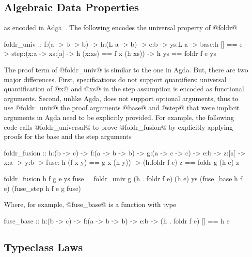 \subsection{Algebraic Data Properties}
\label{subsec:fold}


as encoded in Adga~\citep{agdaequational}.
%
The following encodes the universal property of @foldr@
%
\begin{code}
  foldr_univ :: f:(a -> b -> b)
             -> h:(L a -> b)
             -> e:b
             -> ys:L a
             -> base:{h [] == e }
             -> step:(x:a -> xs:[a] -> {h (x:xs) == f x (h xs)})
             -> {h ys == foldr f e ys}
\end{code}
%
The \toolname proof term of @foldr_univ@
is similar to the one in Agda.
But, there are two major differences.
%
First, specifications do not support
quantifiers: universal quantification
of @x@ and @xs@ in the step assumption
is encoded as functional arguments.
%
Second, unlike Agda, \toolname does not
support optional arguments, thus to use
@foldr_univ@ the proof arguments @base@
and @step@ that were implicit arguments
in Agda need to be explicitly provided.
%
For example, the following code calls
@foldr_universal@ to prove @foldr_fusion@
by explicitly applying proofs for the
base and the step arguments
%
\begin{code}
  foldr_fusion :: h:(b -> c)
               -> f:(a -> b -> b)
               -> g:(a -> c -> c)
               -> e:b
               -> z:[a]
               -> x:a -> y:b
               -> fuse: {h (f x y) == g x (h y)})
               -> {(h.foldr f e) z == foldr g (h e) z}

  foldr_fusion h f g e ys fuse = foldr_univ g (h . foldr f e) (h e) ys
                                   (fuse_base h f e)
                                   (fuse_step h f e g fuse)
\end{code}
%
Where, for example, @fuse_base@ is a function with type
%
\begin{code}
  fuse_base :: h:(b -> c) -> f:(a -> b -> b) -> e:b -> {(h . foldr f e) [] == h e}
\end{code}

\subsection{Typeclass Laws}


